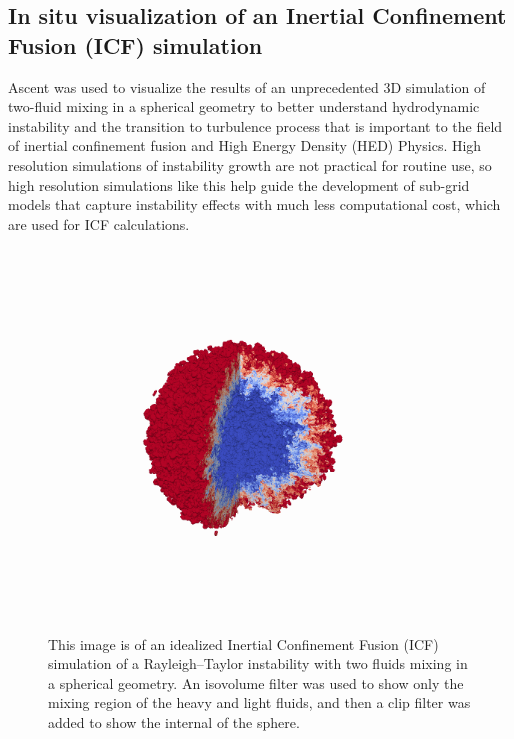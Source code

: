 \subsection{In situ visualization of an Inertial Confinement Fusion (ICF) simulation}

Ascent was used to visualize the results of an unprecedented 3D simulation
of two-fluid mixing in a spherical geometry to better understand hydrodynamic
instability and the transition to turbulence process that is important to
the field of inertial confinement fusion and High Energy Density (HED)
Physics. High resolution simulations of instability growth are not practical
for routine use, so high resolution simulations like this help guide the
development of sub-grid models that capture instability effects with much
less computational cost, which are used for ICF calculations.

\begin{figure}
\centering
\includegraphics[trim={ 0 8cm 0 7cm},width=0.9\textwidth]{images/mixing_ball}
\caption{\label{img:icf}
This image is of an idealized Inertial Confinement
Fusion (ICF) simulation of a Rayleigh–Taylor instability
with two fluids mixing in a spherical geometry.
An isovolume filter was used to show only the mixing region of the heavy and
light fluids, and then a clip filter was added to show the internal of the sphere.
}
\end{figure}

